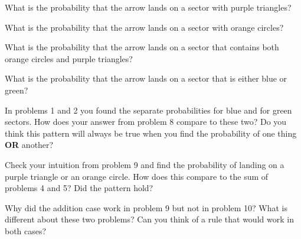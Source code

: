 \documentclass[12pt]{article}
\newenvironment{problem}[2][Problem]{\begin{trivlist}
\item[\hskip \labelsep {\bfseries #1}\hskip \labelsep {\bfseries #2.}]}{\end{trivlist}}
\begin{document}
\begin{problem}{4}
What is the probability that the arrow lands on a sector with purple triangles?\\
\end{problem}

\begin{problem}{5}
What is the probability that the arrow lands on a sector with orange circles?\\	
\end{problem}

\begin{problem}{7}
What is the probability that the arrow lands on a sector that contains both orange circles and purple triangles?\\	
\end{problem}

\begin{problem}{8}
What is the probability that the arrow lands on a sector that is either blue or green?	
\end{problem}

\begin{problem}{9}
In problems 1 and 2 you found the separate probabilities for blue and for green sectors. How does your answer from problem 8 compare to these two? Do you think this pattern will always be true when you find the probability of one thing \textbf{OR} another?\\	
\end{problem}

\begin{problem}{10}
Check your intuition from problem 9 and find the probability of landing on a purple triangle or an orange circle. How does this compare to the sum of problems 4 and 5? Did the pattern hold?\\ 	
\end{problem}


\begin{problem}{11}
Why did the addition case work in problem 9 but not in problem 10? What is different about these two problems? Can you think of a rule that would work in both cases?\\	
\end{problem}
\end{document}
